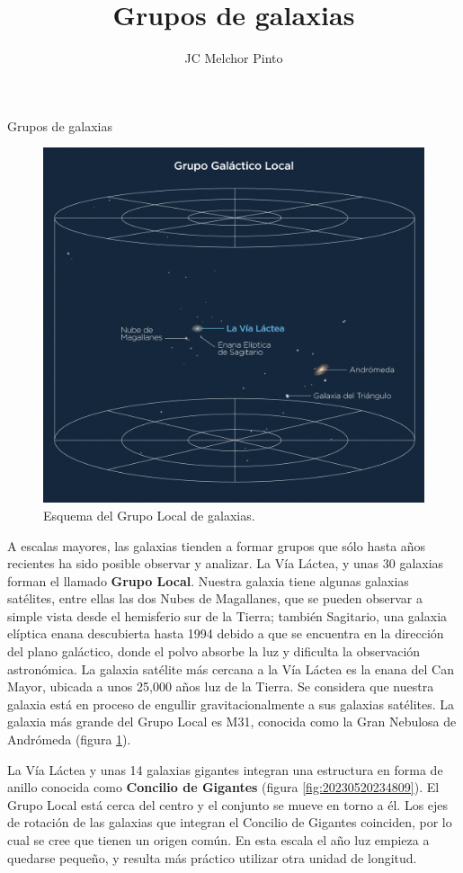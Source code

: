 \documentclass[12pt,addpoints]{guia}
\title{Grupos de galaxias}
\author{JC Melchor Pinto}
\begin{document}
\INFO%
\begin{sectionbox}{Grupos de galaxias}
    \begin{figure}
        \centering
        \includegraphics[width=\linewidth]{../images/grupogalacticolocal}
        \caption{Esquema del Grupo Local de galaxias.}
        \label{fig:grupogalacticolocal}
    \end{figure}
    A escalas mayores, las galaxias tienden a formar grupos
    que sólo hasta años recientes ha sido posible observar
    y analizar.
    La Vía Láctea, y unas 30 galaxias forman el llamado
    \textbf{Grupo Local}. Nuestra galaxia tiene algunas galaxias satélites, entre ellas las dos Nubes de Magallanes, que se
    pueden observar a simple vista desde el hemisferio sur
    de la Tierra; también Sagitario, una galaxia elíptica enana descubierta hasta 1994 debido a que se encuentra en
    la dirección del plano galáctico, donde el polvo absorbe la
    luz y dificulta la observación astronómica. La galaxia
    satélite más cercana a la Vía Láctea es la enana del Can
    Mayor, ubicada a unos 25,000 años luz de la Tierra. Se
    considera que nuestra galaxia está en proceso de engullir gravitacionalmente a sus galaxias satélites. La galaxia
    más grande del Grupo Local es M31, conocida como la
    Gran Nebulosa de Andrómeda (figura \ref{fig:grupogalacticolocal}).
   
    La Vía Láctea y unas 14 galaxias
    gigantes integran una estructura en
    forma de anillo conocida como
    \textbf{Concilio de Gigantes} (figura \ref{fig:20230520234809}). El
    Grupo Local está cerca del centro y
    el conjunto se mueve en torno a él.
    Los ejes de rotación de las galaxias
    que integran el Concilio de Gigantes
    coinciden, por lo cual se cree que tienen un origen común. En esta escala
    el año luz empieza a quedarse pequeño, y resulta más práctico utilizar otra
    unidad de longitud.




\end{sectionbox}
\end{document}
